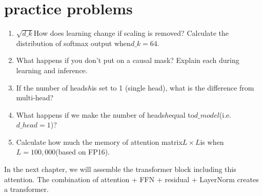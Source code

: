 \section{practice problems}

\begin{enumerate}
\item $\sqrt{d\_k}$How does learning change if scaling is removed?  Calculate the distribution of softmax output when$d\_k = 64$.
\item What happens if you don’t put on a causal mask? Explain each during learning and inference.
\item If the number of heads$h$is set to 1 (single head), what is the difference from multi-head?
\item What happens if we make the number of heads$h$equal to$d\_{model}$(i.e.$d\_{head} = 1$)?
\item Calculate how much the memory of attention matrix$L \times L$is when$L = 100,000$(based on FP16).
\end{enumerate}

In the next chapter, we will assemble the transformer block including this attention. The combination of attention + FFN + residual + LayerNorm creates a transformer.
